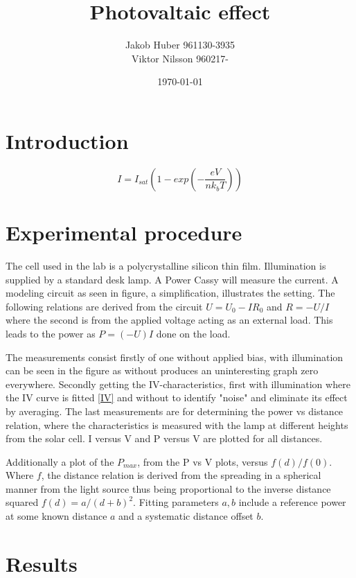 \documentclass[a4paper]{article}
\title{Photovaltaic effect}
\author{Jakob Huber 961130-3935\\ Viktor Nilsson 960217-}
\date{\today}
\begin{document}
\maketitle

\section{Introduction}

\[I=I_{sat}\left( 1 - exp\left( - \frac{eV}{nk_bT}\right) \right)\]\label{IV}

\section{Experimental procedure} 

    The cell used in the lab is a polycrystalline silicon thin film. Illumination is supplied by a standard desk lamp. A Power Cassy will measure the current. A modeling circuit as seen in figure, a simplification, illustrates the setting. The following relations are derived from the circuit $U=U_0-IR_0$ and $R=-U/I$ where the second is from the applied voltage acting as an external load. This leads to the power as $P=(-U)I$ done on the load. 

    The measurements consist firstly of one without applied bias, with illumination can be seen in the figure as without produces an uninteresting graph zero everywhere. Secondly getting the IV-characteristics, first with illumination where the IV curve is fitted \ref{IV} and without to identify "noise" and eliminate its effect by averaging. The last measurements are for determining the power vs distance relation, where the characteristics is measured with the lamp at different heights from the solar cell. I versus V and P versus V are plotted for all distances.
   
    Additionally a plot of the $P_{max}$, from the P vs V plots, versus $f(d)/f(0)$. Where $f$, the distance relation is derived from the spreading in a spherical manner from the light source thus being proportional to the inverse distance squared $f(d)=a/(d+b)^2$. Fitting parameters $a,b$ include a reference power at some known distance $a$ and a systematic distance offset $b$.  

\section{Results}
\end{document}
